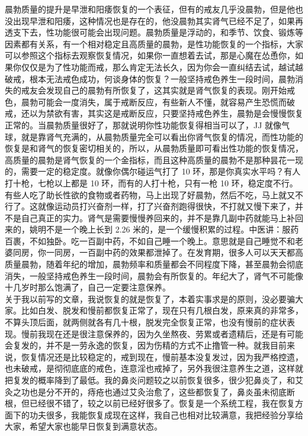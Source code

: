 \begin{case}
    晨勃质量的提升是早泄和阳痿恢复的一个表征，但有的戒友几乎没晨勃，但是他也没出现早泄和阳痿，这种情况也是存在的，他没晨勃其实肾气已经不足了，如果再透支下去，性功能很可能会出现问题。晨勃质量是浮动的，和季节、饮食、锻炼等因素都有关系，有一个相对稳定且高质量的晨勃，是性功能恢复的一个指标，大家可以参照这个指标去观察恢复情况，如果你一直想着去试，那是心魔在怂恿你，如果你仅仅是为了性功能而戒，那么肯定无法长久，因为你会一直纠结去试，越试越破戒，根本无法戒色成功，何谈身体的恢复？一般坚持戒色养生一段时间，晨勃消失的戒友会发现自己的晨勃有所恢复了，这其实就是肾气恢复的表现。刚开始戒色，晨勃可能会一度消失，属于戒断反应，有些新人不懂，就容易产生恐慌而破戒，还以为禁欲有害，其实这是戒断反应，只要坚持戒色养生，晨勃是会慢慢恢复正常的。当晨勃质量很好了，那就说明你性功能恢复得相当可以了，JJ 就像气球，就是靠肾气充满的，从晨勃质量完全可以看出你肾气恢复的情况，而性功能的恢复是和肾气的恢复密切相关的，所以，从晨勃质量即可看出性功能的恢复情况，高质量的晨勃是肾气恢复的一个金指标，而且这种高质量的晨勃不是那种昙花一现的，需要一定的稳定度。就像你偶尔碰运气打了 10 环，那是你真实水平吗？有人打十枪，七枪以上都是 10 环，而有的人打十枪，只有一枪 10 环，稳定度不行。\\
    有些人吃了助长性欲的食物或者药物，马上出现了好晨勃，然后不吃，马上就又不行了。这就像运动员打兴奋剂一样，打了兴奋剂跑得很快，不打就又慢下来了，并不是自己真正的实力。肾气是需要慢慢养回来的，并不是靠几副中药就能马上补回来的，姚明不是一个晚上长到 2.26 米的，是一个缓慢积累的过程。中医讲：服药百裹，不如独卧。吃一百副中药，不如自己睡一个晚上。意思就是自己睡觉不和老婆同房，你一同房，一百副中药的效果都泄掉了。在发育期，很多人可以天天都高质量晨勃，随着年纪的增加，晨勃频率和质量都会不同程度下降，甚至晨勃会彻底消失，一般坚持戒色养生一段时间，晨勃会有所恢复的。年纪大了，肾气不可能像十几岁时那么饱满了，自己一定要注意保养。\\
    关于我以前写的文章，我说恢复的就是恢复了，本着实事求是的原则，没必要骗大家。比如白发、脱发和慢前都恢复正常了，现在只有几根白发，原来真的非常多，不算头顶后面，就两侧就各有几十根，脱发完全恢复正常，也没有慢前的症状表现。慢前我现在还是很注意保养的，因为久坐熬夜、劳累或者遗精后，还是有可能会复发的，并不是一劳永逸的恢复，因为伤精的方式不止撸管一种。就我目前来说，恢复情况还是比较稳定的，戒到现在，慢前基本没复发过，因为我严格控遗，也未破戒，是彻彻底底的戒色，连意淫也戒掉了，另外我很注意养生之道，这样就把复发的概率降到了最低。我的鼻炎问题较之以前恢复很多，很少犯鼻炎了，和艾灸之功也是分不开的，痔疮也通过艾灸治愈了，这些都恢复了，鼻炎虽未彻底断根，但已经很不错了，较之以前已经好很多了。恢复是一个系统工程，我在恢复方面下的功夫很多，我能恢复成现在这样，我自己也相对比较满意，我把经验分享给大家，希望大家也能早日恢复到满意状态。\\

\end{case}
